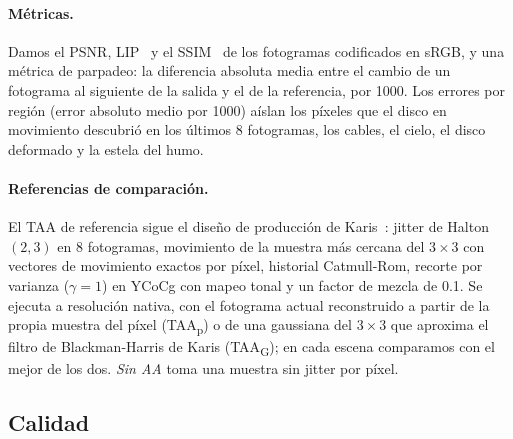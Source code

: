 \documentclass[11pt,a4paper]{article}
\newcommand{\FLIP}{\reflectbox{F}LIP}
\begin{document}
\paragraph{Métricas.} Damos el PSNR, \FLIP{}~\cite{andersson2020flip} y el SSIM~\cite{wang2004ssim} de los fotogramas codificados en sRGB, y una métrica de parpadeo: la diferencia absoluta media entre el cambio de un fotograma al siguiente de la salida y el de la referencia, por 1000. Los errores por región (error absoluto medio por 1000) aíslan los píxeles que el disco en movimiento descubrió en los últimos 8 fotogramas, los cables, el cielo, el disco deformado y la estela del humo.

\paragraph{Referencias de comparación.} El TAA de referencia sigue el diseño de producción de Karis~\cite{karis2014taa}: jitter de Halton$(2,3)$ en 8 fotogramas, movimiento de la muestra más cercana del $3\times3$ con vectores de movimiento exactos por píxel, historial Catmull-Rom, recorte por varianza ($\gamma=1$) en YCoCg con mapeo tonal y un factor de mezcla de 0.1. Se ejecuta a resolución nativa, con el fotograma actual reconstruido a partir de la propia muestra del píxel (TAA\textsubscript{p}) o de una gaussiana del $3\times3$ que aproxima el filtro de Blackman-Harris de Karis (TAA\textsubscript{G}); en cada escena comparamos con el mejor de los dos. \emph{Sin AA} toma una muestra sin jitter por píxel.

\subsection{Calidad}

\begin{table}[t]
\centering
\setlength{\tabcolsep}{3.5pt}
\caption{Resumen de las \nNumScenes{} escenas. \emph{Píx.\ render}: píxeles renderizados por píxel de salida. PSNR en dB. \emph{Victorias}: escenas en las que el PSNR supera al mejor TAA de referencia. Los modos de escalado se comparan con el TAA a resolución nativa, que renderiza de 1.7 a 4 veces más píxeles.}
\label{tab:summary}
\small

\end{table}

\begin{table}[t]
\centering
\caption{PSNR (dB) por escena; el mejor valor de cada fila en negrita.}
\label{tab:quality}
\small

\end{table}
\end{document}
